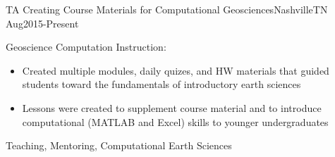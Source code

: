 \begin{experiences}
 \experience
    {TA}       {Creating Course Materials for Computational Geosciences}{Nashville}{TN}
    {Aug2015-Present} {Geoscience Computation Instruction:
                      \begin{itemize}
                        \item Created multiple modules, daily quizes, and HW materials that guided students toward the fundamentals of introductory earth sciences
                        \item Lessons were created to supplement course material and to introduce computational (MATLAB and Excel) skills to younger undergraduates
                      \end{itemize}
                    }
                    {Teaching, Mentoring, Computational Earth Sciences}
  \emptySeparator  
\end{experiences}

